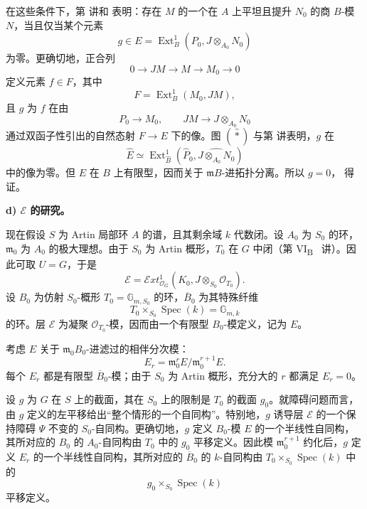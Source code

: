 在这些条件下，第  讲和  表明：存在 \(M\) 的一个在 \(A\) 上平坦且提升 \(N_0\) 的商 \(B\)-模 \(N\)，当且仅当某个元素
\[
  g\in E=\operatorname{Ext}^{1}_B
  (P_0,J\otimes_{A_0}N_0)
\]
为零。更确切地，正合列
\[
  0\longrightarrow JM\longrightarrow M
  \longrightarrow M_0\longrightarrow0
\]
定义元素 \(f\in F\)，其中
\[
  F=\operatorname{Ext}^{1}_B(M_0,JM),
\]
且 \(g\) 为 \(f\) 在由
\[
  P_0\longrightarrow M_0,
  \qquad
  JM\longrightarrow J\otimes_{A_0}N_0
\]
通过双函子性引出的自然态射 \(F\to E\) 下的像。图 \((\widehat\ast)\) 与第  讲表明，\(g\) 在
\[
  \widehat E\simeq
  \operatorname{Ext}^{1}_{\widehat B}
  (\widehat P_0,\widehat{J\otimes_{A_0}N_0})
\]
中的像为零。但 \(E\) 在 \(B\) 上有限型，因而关于 \(\mathfrak mB\)-进拓扑分离。所以 \(g=0\)， 得证。

\medskip\noindent\textbf{d) \(\boldsymbol{\mathscr E}\) 的研究。}

现在假设 \(S\) 为 Artin 局部环 \(A\) 的谱，且其剩余域 \(k\) 代数闭。设 \(A_0\) 为 \(S_0\) 的环，\(\mathfrak m_0\) 为 \(A_0\) 的极大理想。由于 \(S_0\) 为 Artin 概形，\(T_0\) 在 \(G\) 中闭（第 VI\textsubscript{B}~ 讲）。因此可取 \(U=G\)，于是
\[
  \mathscr E=
  \mathcal Ext^{1}_{\mathcal O_G}
  (K_0,J\otimes_{S_0}\mathcal O_{T_0}).
\]
设 \(B_0\) 为仿射 \(S_0\)-概形 \(T_0=\mathbb G_{m,S_0}\) 的环，\(\overline B_0\) 为其特殊纤维
\[
  T_0\times_{S_0}\operatorname{Spec}(k)=\mathbb G_{m,k}
\]
的环。层 \(\mathscr E\) 为凝聚 \(\mathcal O_{T_0}\)-模，因而由一个有限型 \(B_0\)-模定义，记为 \(E\)。

考虑 \(E\) 关于 \(\mathfrak m_0B_0\)-进滤过的相伴分次模：
\[
  E_r=\mathfrak m_0^rE/\mathfrak m_0^{r+1}E.
\]
每个 \(E_r\) 都是有限型 \(\overline B_0\)-模；由于 \(S_0\) 为 Artin 概形，充分大的 \(r\) 都满足 \(E_r=0\)。

设 \(g\) 为 \(G\) 在 \(S\) 上的截面，其在 \(S_0\) 上的限制是 \(T_0\) 的截面 \(g_0\)。就障碍问题而言，由 \(g\) 定义的左平移给出“整个情形的一个自同构”。特别地，\(g\) 诱导层 \(\mathscr E\) 的一个保持障碍 \(\Psi\) 不变的 \(S_0\)-自同构。更确切地，\(g\) 定义 \(B_0\)-模 \(E\) 的一个半线性自同构，其所对应的 \(B_0\) 的 \(A_0\)-自同构由 \(T_0\) 中的 \(g_0\) 平移定义。因此模 \(\mathfrak m_0^{r+1}\) 约化后，\(g\) 定义 \(E_r\) 的一个半线性自同构，其所对应的 \(\overline B_0\) 的 \(k\)-自同构由 \(T_0\times_{S_0}\operatorname{Spec}(k)\) 中的
\[
  g_0\times_{S_0}\operatorname{Spec}(k)
\]
平移定义。

